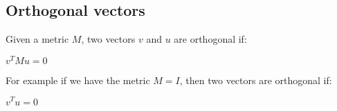 
\subsection{Orthogonal vectors}

Given a metric \(M\), two vectors \(v\) and \(u\) are orthogonal if:

\(v^TMu=0\)

For example if we have the metric \(M=I\), then two vectors are orthogonal if:

\(v^Tu=0\)

